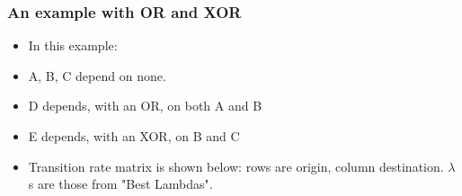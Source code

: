 \documentclass[11pt]{article}
\begin{document}
\subsubsection{An example with OR and XOR}
\label{sec:org6769f8f}
\begin{itemize}
\item In this example:
\end{itemize}
\begin{itemize}
 \item A, B, C depend on none.
 \item D depends, with an OR, on both A and B
 \item E depends, with an XOR, on B and C
 \item Transition rate matrix is shown below: rows are origin, column destination. $\lambda$s are those from "Best Lambdas".
 \end{itemize}
\end{document}
